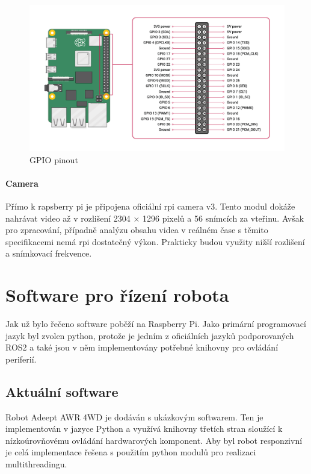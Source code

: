 \begin{figure}[h!]
	\centering
	\includegraphics[scale=0.15]{obrazky-figures/gpio_pinout.png}
	\caption{GPIO pinout}
	\label{}
\end{figure}

\subsubsection*{Camera} %
Přímo k rapsberry pi je připojena oficiální rpi camera v3. Tento modul dokáže nahrávat video až v rozlišení 2304 × 1296 pixelů a 56 snímcích za vteřinu. Avšak pro zpracování, případně analýzu obsahu videa v reálném čase s těmito specifikacemi nemá rpi dostatečný výkon. Prakticky budou využity nižší rozlišení a snímkovací frekvence. 

\chapter{Software pro řízení robota}
Jak už bylo řečeno software poběží na Raspberry Pi. Jako primární programovací jazyk byl zvolen python, protože je jedním z oficiálních jazyků podporovaných ROS2 a také jsou v něm implementovány potřebné knihovny pro ovládání periferií.

\section{Aktuální software}
Robot Adeept AWR 4WD je dodáván s ukázkovým softwarem. Ten je implementován v jazyce Python a využívá knihovny třetích stran sloužící k nízkoúrovňovému ovládání hardwarových komponent. Aby byl robot responzivní je celá implementace řešena s použitím python modulů pro realizaci multithreadingu.

